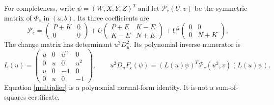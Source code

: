 \documentclass[11pt]{article}
\begin{document}
For completeness, write $\psi=(W,X,Y,Z)^T$ and let $\mathcal P_c(U,v)$
be the symmetric matrix of $\Phi_c$ in $(a,b)$. Its three coefficients are
\begin{equation}
\mathcal P_c=
\begin{pmatrix}P+K&0\\0&0\end{pmatrix}
+U\begin{pmatrix}P+E&K-E\\K-E&N+E\end{pmatrix}
+U^2\begin{pmatrix}0&0\\0&N+K\end{pmatrix}.\label{quadratic}
\end{equation}
The change matrix has determinant $u^2D_u^2$.  Its polynomial inverse
numerator is
\begin{equation}
L(u)=\begin{pmatrix}
u&0&u^2&0\\0&u&0&u^2\\u&0&-1&0\\0&u&0&-1
\end{pmatrix},\qquad
\boxed{u^2D_uF_c(\psi)=(L(u)\psi)^T
\mathcal P_c(u^2,v)(L(u)\psi).}\label{multiplier}
\end{equation}
Equation \eqref{multiplier} is a polynomial normal-form identity. It is not a
sum-of-squares certificate.
\end{document}
